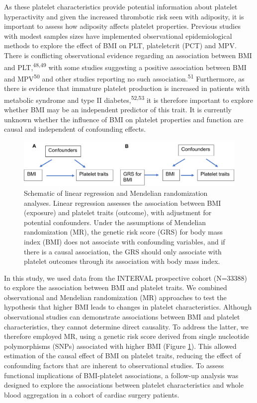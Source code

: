 \documentclass[11pt,twoside]{bristolthesis}
\begin{document}
As these platelet characteristics provide potential information about platelet hyperactivity and given the increased thrombotic risk seen with adiposity, it is important to assess how adiposity affects platelet properties. Previous studies with modest samples sizes have implemented observational epidemiological methods to explore the effect of BMI on PLT, plateletcrit (PCT) and MPV. There is conflicting observational evidence regarding an association between BMI and PLT,\textsuperscript{48,49} with some studies suggesting a positive association between BMI and MPV\textsuperscript{50} and other studies reporting no such association.\textsuperscript{51} Furthermore, as there is evidence that immature platelet production is increased in patients with metabolic syndrome and type II diabetes,\textsuperscript{52,53} it is therefore important to explore whether BMI may be an independent predictor of this trait. It is currently unknown whether the influence of BMI on platelet properties and function are causal and independent of confounding effects.
\begin{figure}
\includegraphics{figure/BMI_platelets/obsvMRexample} \caption[Schematic of linear regression and Mendelian randomization analyses]{Schematic of linear regression and Mendelian randomization analyses. Linear regression assesses the association between BMI (exposure) and platelet traits (outcome), with adjustment for potential confounders. Under the assumptions of Mendelian randomization (MR), the genetic risk score (GRS) for body mass index (BMI) does not associate with confounding variables, and if there is a causal association, the GRS should only associate with platelet outcomes through its association with body mass index.}\label{fig:Linear-reg-MR}
\end{figure}
In this study, we used data from the INTERVAL prospective cohort (N=33388) to explore the association between BMI and platelet traits. We combined observational and Mendelian randomization (MR) approaches to test the hypothesis that higher BMI leads to changes in platelet characteristics. Although observational studies can demonstrate associations between BMI and platelet characteristics, they cannot determine direct causality. To address the latter, we therefore employed MR, using a genetic risk score derived from single nucleotide polymorphisms (SNPs) associated with higher BMI (Figure \ref{fig:Linear-reg-MR}). This allowed estimation of the causal effect of BMI on platelet traits, reducing the effect of confounding factors that are inherent to observational studies. To assess functional implications of BMI-platelet associations, a follow-up analysis was designed to explore the associations between platelet characteristics and whole blood aggregation in a cohort of cardiac surgery patients.
\end{document}
